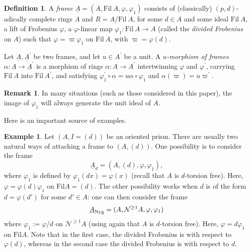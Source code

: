 \documentclass{amsart}
\theoremstyle{plain}
\theoremstyle{definition}
\newtheorem{definition}[theorem]{Definition}
\newtheorem{example}[theorem]{Example}
\newtheorem{remark}[theorem]{Remark}
\newcommand{\Fil}{\mathrm{Fil}}
\newcommand{\red}[1]{{\color{black} #1}}
\begin{document}
\begin{definition} \label{frame}
A \textit{frame} $\underline{A}=(A,\Fil ~A, \varphi, \varphi_1)$ consists of (classically) $(p,d)$-adically complete rings $A$ and $R=A/\Fil~A$, for some $d \in A$ and some ideal $\Fil ~A$, a lift of Frobenius $\varphi$, a $\varphi$-linear map $\varphi_1 : \Fil~ A \to A$ \red{(called the \textit{divided Frobenius} on $A$)} such that $\varphi=\varpi \varphi_1$ on $\Fil~ A$, with $\varpi=\varphi(d)$.

\red{Let $\underline{A}, \underline{A}^\prime$ be two frames, and let $u \in A^\prime$ be a unit. A \textit{$u$-morphism of frames} $\alpha: \underline{A} \to \underline{A}^\prime$ is a morphism of rings $\alpha : A \to A^\prime$ intertwinning $\varphi$ and $\varphi^\prime$, carrying $\Fil~ A$ into $\Fil~ A^\prime$, and satisfying $\varphi_1^\prime \circ \alpha = u \alpha \circ \varphi_1$ and $\alpha(\varpi)=u \varpi^\prime$.}
\end{definition}


\begin{remark} \label{firstremark}
	In many situations (such as those considered in this paper), the image of $\varphi_1$ will always generate the unit ideal of $A$.
\end{remark}


Here is an important source of examples. 

\begin{example} \label{exprism}
	Let $(A,I=(d))$ be an oriented prism. There are usually two natural ways of attaching a frame to $(A,(d))$. One possibility is to consider the frame
	\[ \underline{A}_d = (A,(d),\varphi,\varphi_1), \]
	where $\varphi_1$ is defined by $\varphi_1(dx)=\varphi(x)$ (recall that $A$ is $d$-torsion free). Here, $\varphi=\varphi(d)\varphi_1$ on $\mathrm{Fil} A=(d)$. The other possibility \red{works when $d$ is of the form $d=\varphi(d')$ for some $d'\in A$}: one can then consider the frame
	\[ \underline{A}_{\rm Nyg}=(A, \mathcal{N}^{\geq 1} A, \varphi, \varphi_1) \]
	where $\varphi_1:=\varphi/d$ on $\mathcal{N}^{\geq 1}A$ (using again that $A$ is $d$-torsion free). Here, $\varphi=d\varphi_1$ on $\mathrm{Fil} A$. Note that in the first case, the divided Frobenius is with respect to $\varphi(d)$, whereas in the second case the divided Frobenius is with respect to $d$. 
   \end{example} 
\end{document}
